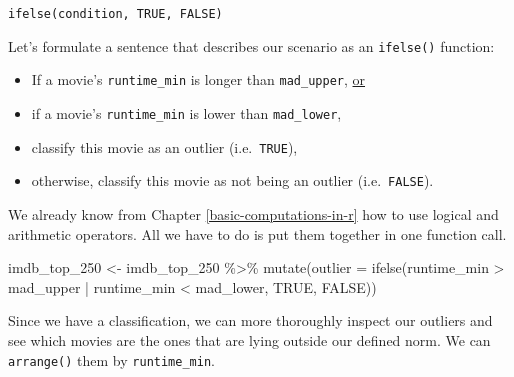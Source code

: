 \documentclass[
]{book}
\newenvironment{Shaded}{\begin{snugshade}}{\end{snugshade}}
\newcommand{\AttributeTok}[1]{\textcolor[rgb]{0.77,0.63,0.00}{#1}}
\newcommand{\ConstantTok}[1]{\textcolor[rgb]{0.00,0.00,0.00}{#1}}
\newcommand{\FunctionTok}[1]{\textcolor[rgb]{0.00,0.00,0.00}{#1}}
\newcommand{\NormalTok}[1]{#1}
\newcommand{\OtherTok}[1]{\textcolor[rgb]{0.56,0.35,0.01}{#1}}
\newcommand{\SpecialCharTok}[1]{\textcolor[rgb]{0.00,0.00,0.00}{#1}}
\begin{document}
\leavevmode\hypertarget{ifelse-function}{}%
\texttt{ifelse(condition,\ TRUE,\ FALSE)}

Let's formulate a sentence that describes our scenario as an \texttt{ifelse()} function:

\begin{itemize}
\item
  If a movie's \texttt{runtime\_min} is longer than \texttt{mad\_upper}, \underline{or}
\item
  if a movie's \texttt{runtime\_min} is lower than \texttt{mad\_lower},
\item
  classify this movie as an outlier (i.e.~\texttt{TRUE}),
\item
  otherwise, classify this movie as not being an outlier (i.e.~\texttt{FALSE}).
\end{itemize}

We already know from Chapter \ref{basic-computations-in-r} how to use logical and arithmetic operators. All we have to do is put them together in one function call.

\begin{Shaded}
\begin{Highlighting}[]
\NormalTok{imdb\_top\_250 }\OtherTok{\textless{}{-}}\NormalTok{ imdb\_top\_250 }\SpecialCharTok{\%\textgreater{}\%} 
  \FunctionTok{mutate}\NormalTok{(}\AttributeTok{outlier =} \FunctionTok{ifelse}\NormalTok{(runtime\_min }\SpecialCharTok{\textgreater{}}\NormalTok{ mad\_upper }\SpecialCharTok{|}\NormalTok{ runtime\_min }\SpecialCharTok{\textless{}}\NormalTok{ mad\_lower,}
                          \ConstantTok{TRUE}\NormalTok{, }\ConstantTok{FALSE}\NormalTok{))}
\end{Highlighting}
\end{Shaded}

Since we have a classification, we can more thoroughly inspect our outliers and see which movies are the ones that are lying outside our defined norm. We can \texttt{arrange()} them by \texttt{runtime\_min}.
\end{document}
